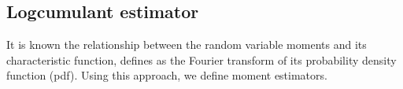 \documentclass[twocolumn]{svjour3}
\begin{document}
%	
%	
%	



\subsection{Logcumulant estimator}
\label{lc}
It is known the relationship between the random variable moments and its characteristic function, defines as the Fourier transform of its probability density function (pdf). Using this approach, we define moment estimators. 
\end{document}
